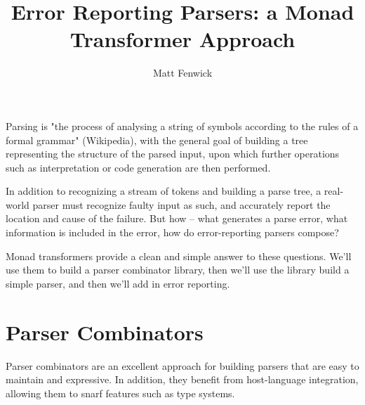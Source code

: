 \documentclass{tmr}
\title{Error Reporting Parsers:  a Monad Transformer Approach}
\author{Matt Fenwick\email{mfenwick100@gmail.com}}
\begin{document}
\begin{introduction}
Parsing is "the process of analysing a string of symbols according to the rules
of a formal grammar" (Wikipedia), with the general goal of building a tree
representing the structure of the parsed input, upon which further operations
such as interpretation or code generation are then performed.

In addition to recognizing a stream of tokens and building a parse tree, a
real-world parser must recognize faulty input as such, and accurately report the
location and cause of the failure.  But how -- what generates a parse error,
what information is included in the error, how do error-reporting parsers
compose?

Monad transformers provide a clean and simple answer to these questions.
We'll use them to build a parser combinator library, then we'll use the library
build a simple parser, and then we'll add in error reporting.
\end{introduction}




\section{Parser Combinators}
Parser combinators are an excellent approach for building parsers that are easy
to maintain and expressive.  In addition, they benefit from host-language
integration, allowing them to snarf features such as type systems.
\end{document}

